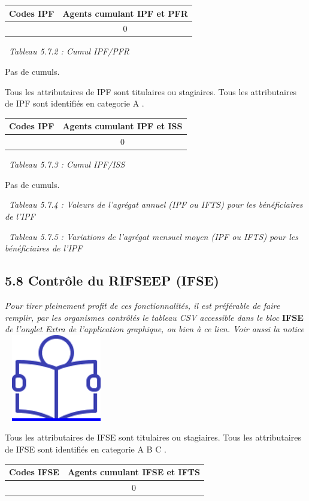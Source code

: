\begin{longtable}[]{@{}cc@{}}
\toprule
Codes IPF & Agents cumulant IPF et PFR\tabularnewline
\midrule
\endhead
& 0\tabularnewline
\bottomrule
\end{longtable}

~\emph{Tableau 5.7.2 : Cumul IPF/PFR}

Pas de cumuls.

Tous les attributaires de IPF sont titulaires ou stagiaires. Tous les
attributaires de IPF sont identifiés en categorie A .

\begin{longtable}[]{@{}cc@{}}
\toprule
Codes IPF & Agents cumulant IPF et ISS\tabularnewline
\midrule
\endhead
& 0\tabularnewline
\bottomrule
\end{longtable}

~\emph{Tableau 5.7.3 : Cumul IPF/ISS}

Pas de cumuls.

~\emph{Tableau 5.7.4 : Valeurs de l'agrégat annuel (IPF ou IFTS) pour
les bénéficiaires de l'IPF}

~\emph{Tableau 5.7.5 : Variations de l'agrégat mensuel moyen (IPF ou
IFTS) pour les bénéficiaires de l'IPF}

\hypertarget{controle-du-rifseep-ifse}{%
\subsection{5.8 Contrôle du RIFSEEP
(IFSE)}\label{controle-du-rifseep-ifse}}

\emph{Pour tirer pleinement profit de ces fonctionnalités, il est
préférable de faire remplir, par les organismes contrôlés le tableau CSV
accessible dans le bloc} \textbf{IFSE} \emph{de l'onglet Extra de
l'application graphique, ou bien à ce lien. Voir aussi la notice} ~
\href{../Docs/Notices/fiche_tableau_ifse.odt}{\includegraphics{icones/Notice.png}}

Tous les attributaires de IFSE sont titulaires ou stagiaires. Tous les
attributaires de IFSE sont identifiés en categorie A B C .

\begin{longtable}[]{@{}cc@{}}
\toprule
Codes IFSE & Agents cumulant IFSE et IFTS\tabularnewline
\midrule
\endhead
& 0\tabularnewline
\bottomrule
\end{longtable}

